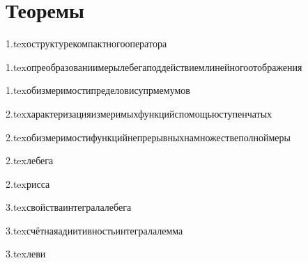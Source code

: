 






\section{Теоремы}

{1.tex}{оструктурекомпактногооператора}

{1.tex}{опреобразованиимерылебегаподдействиемлинейногоотображения}

{1.tex}{обизмеримостипределовисупрмемумов}

{2.tex}{характеризацияизмеримыхфункцийспомощьюступенчатых}

{2.tex}{обизмеримостифункцийнепрерывныхнамножествеполноймеры}

{2.tex}{лебега}

{2.tex}{рисса}

{3.tex}{свойстваинтегралалебега}

{3.tex}{счётнаяадиитивностьинтегралалемма}

{3.tex}{леви}




